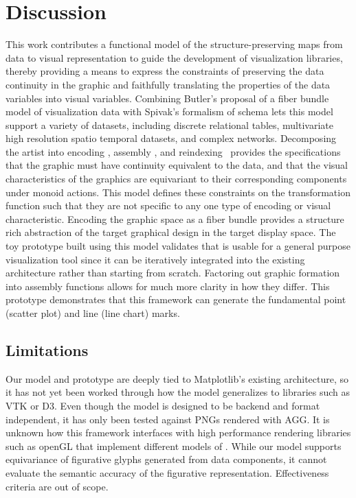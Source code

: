 \documentclass[journal]{vgtc}                %
\begin{document}
\section{Discussion}
This work contributes a functional model of the structure-preserving maps from data to visual representation to guide the development of visualization libraries, thereby providing a means to express the constraints of preserving the data continuity in the graphic and faithfully translating the properties of the data variables into visual variables. Combining Butler's proposal of a fiber bundle model of visualization data with Spivak's formalism of schema lets this model support a variety of datasets, including  discrete relational tables, multivariate high resolution spatio temporal datasets, and complex networks. Decomposing the artist into encoding \vchannel, assembly \vmark, and reindexing \vindex\ provides the specifications that the graphic must have continuity equivalent to the data, and that the visual characteristics of the graphics are equivariant to their corresponding components under monoid actions. This model defines these constraints on the transformation function such that they are not specific to any one type of encoding or visual characteristic. Encoding the graphic space as a fiber bundle provides a structure rich abstraction of the target graphical design in the target display space. The toy prototype built using this model validates that is usable for a general purpose visualization tool since it can be iteratively integrated into the existing architecture rather than starting from scratch. Factoring out graphic formation into assembly functions allows for much more clarity in how they differ. This prototype demonstrates that this framework can generate the fundamental point (scatter plot) and line (line chart) marks. 

\subsection{Limitations}
Our model and prototype are deeply tied to Matplotlib's existing architecture, so it has not yet been worked through how the model generalizes to libraries such as VTK or D3. Even though the model is designed to be backend and format independent, it has only been tested against PNGs rendered with AGG\cite{shemanarevAntiGrainGeometry}. It is unknown how this framework interfaces with high performance rendering libraries such as openGL\cite{CarsonOpenGL1997} that implement different models of \gsection. While our model supports equivariance of figurative glyphs \cite{byrneAcquiredCodesMeaning2016} generated from data components\cite{beckfeathers2014,byrneFigurativeFramesCritical2017}, it cannot evaluate the semantic accuracy of the figurative representation. Effectiveness criteria\cite{mackinlayAutomaticDesignGraphical1987,chambersGraphicalMethodsData1983a} are out of scope.
\end{document}
